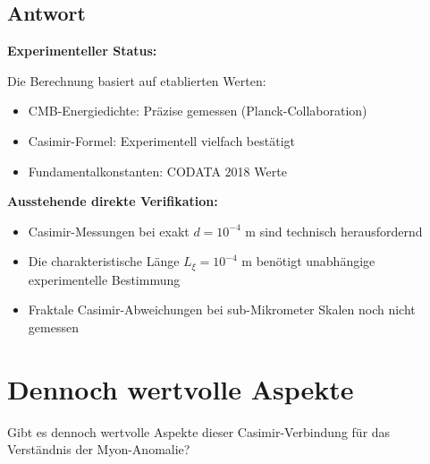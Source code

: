 \documentclass[12pt,a4paper]{article}
\theoremstyle{remark}
\newenvironment{answer}{\subsection*{Antwort}}{\vspace{1em}}
\begin{document}
\begin{answer}
	\textbf{Experimenteller Status:}
	
	Die Berechnung basiert auf etablierten Werten:
	\begin{itemize}
		\item CMB-Energiedichte: Präzise gemessen (Planck-Collaboration)
		\item Casimir-Formel: Experimentell vielfach bestätigt
		\item Fundamentalkonstanten: CODATA 2018 Werte
	\end{itemize}
	
	\textbf{Ausstehende direkte Verifikation:}
	\begin{itemize}
		\item Casimir-Messungen bei exakt $d = 10^{-4}$ m sind technisch herausfordernd
		\item Die charakteristische Länge $L_\xi = 10^{-4}$ m benötigt unabhängige experimentelle Bestimmung
		\item Fraktale Casimir-Abweichungen bei sub-Mikrometer Skalen noch nicht gemessen
	\end{itemize}
\end{answer}
\section{Dennoch wertvolle Aspekte}

\begin{question}
	Gibt es dennoch wertvolle Aspekte dieser Casimir-Verbindung für das Verständnis der Myon-Anomalie?
\end{question}
\end{document}
